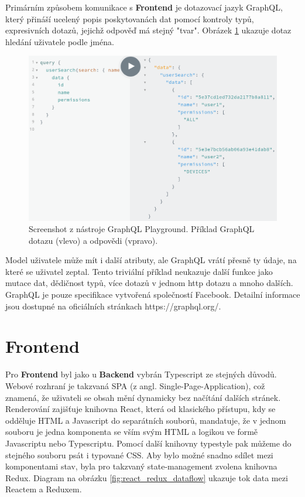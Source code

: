 Primárním způsobem komunikace s \textbf{Frontend}
je dotazovací jazyk GraphQL, který přináší ucelený popis poskytovanách dat pomocí kontroly typů,
expresivních dotazů, jejichž odpověď má stejný "tvar". Obrázek \ref{fig:graphql_example} ukazuje dotaz hledání uživatele podle jména.

\begin{figure} \centering
\includegraphics[width=145mm]{../img/graphql_example.png}
\caption{Screenshot z nástroje GraphQL Playground. Příklad GraphQL dotazu (vlevo) a odpovědi (vpravo).}
\label{fig:graphql_example}
\end{figure}

Model uživatele může mít i další atributy, ale GraphQL vrátí přesně ty údaje, na které se uživatel zeptal.
Tento triviální příklad neukazuje další funkce jako mutace dat, dědičnost typů, více dotazů v jednom http dotazu
a mnoho dalších.
GraphQL je pouze specifikace vytvořená společností Facebook. Detailní informace jsou dostupné na oficiálních
stránkach https://graphql.org/.

\section{Frontend} \label{frontend}

Pro \textbf{Frontend} byl jako u \textbf{Backend} vybrán Typescript ze stejných důvodů. Webové rozhraní
je takzvaná SPA (z angl. Single-Page-Application), což znamená, že uživateli se obsah mění dynamicky
bez načítání dalších stránek.
Renderování zajišťuje knihovna React, která od klasického přístupu, kdy se odděluje HTML a Javascript do separátních
souborů, mandatuje, že v jednom souboru je jedna komponenta se vším svým HTML a logikou ve formě Javascriptu nebo
Typescriptu. Pomocí další knihovny typestyle pak můžeme do stejného souboru psát i typované CSS.
Aby bylo možné snadno sdílet mezi komponentami stav, byla pro takzvaný state-management zvolena knihovna Redux.
Diagram na obrázku \ref{fig:react_redux_dataflow} ukazuje tok data mezi Reactem a Reduxem.

